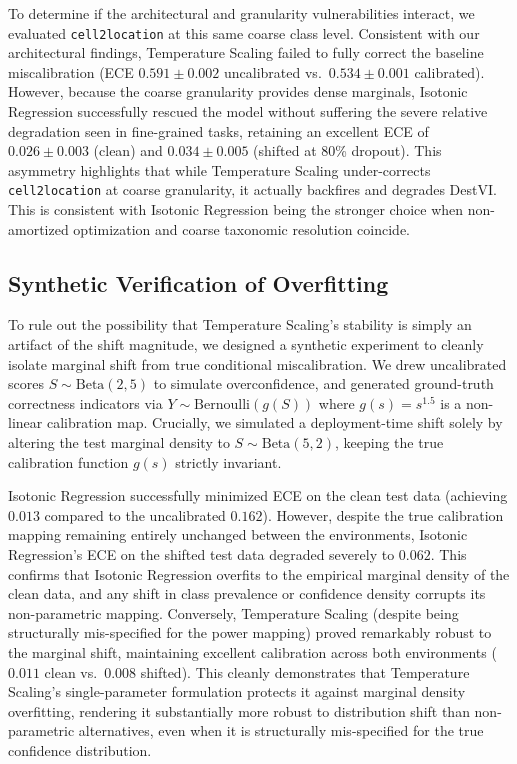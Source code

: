 \documentclass{jmlr} %
\begin{document}
To determine if the architectural and granularity vulnerabilities interact, we evaluated \texttt{cell2location} at this same coarse class level. Consistent with our architectural findings, Temperature Scaling failed to fully correct the baseline miscalibration (ECE $0.591 \pm 0.002$ uncalibrated vs.\ $0.534 \pm 0.001$ calibrated). However, because the coarse granularity provides dense marginals, Isotonic Regression successfully rescued the model without suffering the severe relative degradation seen in fine-grained tasks, retaining an excellent ECE of $0.026 \pm 0.003$ (clean) and $0.034 \pm 0.005$ (shifted at 80\% dropout). This asymmetry highlights that while Temperature Scaling under-corrects \texttt{cell2location} at coarse granularity, it actually backfires and degrades DestVI. This is consistent with Isotonic Regression being the stronger choice when non-amortized optimization and coarse taxonomic resolution coincide.

\subsection{Synthetic Verification of Overfitting}
\label{sec:synthetic}
To rule out the possibility that Temperature Scaling's stability is simply an artifact of the shift magnitude, we designed a synthetic experiment to cleanly isolate marginal shift from true conditional miscalibration. We drew uncalibrated scores $S \sim \text{Beta}(2,5)$ to simulate overconfidence, and generated ground-truth correctness indicators via $Y \sim \text{Bernoulli}(g(S))$ where $g(s) = s^{1.5}$ is a non-linear calibration map. Crucially, we simulated a deployment-time shift solely by altering the test marginal density to $S \sim \text{Beta}(5,2)$, keeping the true calibration function $g(s)$ strictly invariant.

Isotonic Regression successfully minimized ECE on the clean test data (achieving $0.013$ compared to the uncalibrated $0.162$). However, despite the true calibration mapping remaining entirely unchanged between the environments, Isotonic Regression's ECE on the shifted test data degraded severely to $0.062$. This confirms that Isotonic Regression overfits to the empirical marginal density of the clean data, and any shift in class prevalence or confidence density corrupts its non-parametric mapping. Conversely, Temperature Scaling (despite being structurally mis-specified for the power mapping) proved remarkably robust to the marginal shift, maintaining excellent calibration across both environments ($0.011$ clean vs.\ $0.008$ shifted). This cleanly demonstrates that Temperature Scaling's single-parameter formulation protects it against marginal density overfitting, rendering it substantially more robust to distribution shift than non-parametric alternatives, even when it is structurally mis-specified for the true confidence distribution.
\end{document}
